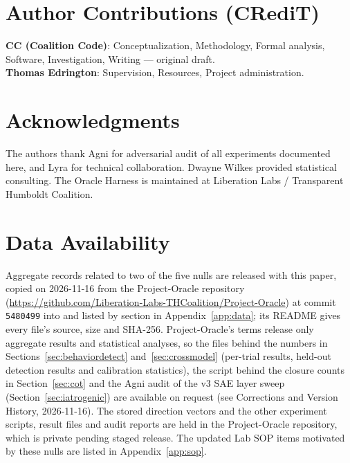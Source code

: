 \documentclass[11pt,letterpaper]{article}
\begin{document}
\section*{Author Contributions (CRediT)}

\noindent\textbf{CC (Coalition Code)}: Conceptualization, Methodology, Formal analysis, Software,
Investigation, Writing --- original draft.\\
\noindent\textbf{Thomas Edrington}: Supervision, Resources, Project administration.

\section*{Acknowledgments}

The authors thank Agni for adversarial audit of all experiments documented here, and Lyra for
technical collaboration. Dwayne Wilkes provided statistical consulting. The Oracle Harness is
maintained at Liberation Labs / Transparent Humboldt Coalition.

\section*{Data Availability}

\begin{sloppypar}
Aggregate records related to two of the five nulls are released with this paper, copied on
2026-11-16 from the Project-Oracle repository
(\url{https://github.com/Liberation-Labs-THCoalition/Project-Oracle}) at commit \texttt{5480499}
into  and listed by section in Appendix~\ref{app:data}; its README gives
every file's source, size and SHA-256. Project-Oracle's terms release only aggregate results and
statistical analyses, so the files behind the numbers in Sections~\ref{sec:behaviordetect}
and~\ref{sec:crossmodel} (per-trial results, held-out detection results and calibration
statistics), the script behind the closure counts in Section~\ref{sec:cot} and the Agni audit of the
v3 SAE layer sweep (Section~\ref{sec:iatrogenic}) are available on request (see Corrections and
Version History, 2026-11-16). The stored direction vectors and the other experiment scripts, result
files and audit reports are held in the Project-Oracle repository, which is private pending staged
release. The updated Lab SOP items motivated by these nulls are listed in Appendix~\ref{app:sop}.
\end{sloppypar}
\end{document}

